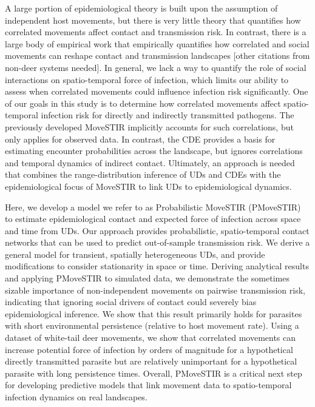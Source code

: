 \documentclass[letterpaper]{article}
\begin{document}
A large portion of epidemiological theory is built upon the assumption of independent host movements, but there is very little theory that quantifies how correlated movements affect contact and transmission risk. In contrast, there is a large body of empirical work that empirically quantifies how correlated and social movements can reshape contact and transmission landscapes \citep{Kjaer2008,Grear2010,Schauber2015a,Webber2023} [other citations from non-deer systems needed]. In general, we lack a way to quantify the role of social interactions on spatio-temporal force of infection, which limits our ability to assess when correlated movements could influence infection risk significantly. One of our goals in this study is to determine how correlated movements affect spatio-temporal infection risk for directly and indirectly transmitted pathogens. %
The previously developed MoveSTIR implicitly accounts for such correlations, but only applies for observed data. In contrast, the CDE provides a basis for estimating encounter probabilities across the landscape, but ignores correlations and temporal dynamics of indirect contact.
Ultimately, an approach is needed that combines the range-distribution inference of UDs and CDEs \citep{Alston2022,Noonan2021} with the epidemiological focus of MoveSTIR to link UDs to epidemiological dynamics. 

Here, we develop a model we refer to as Probabilistic MoveSTIR (PMoveSTIR) to estimate epidemiological contact and expected force of infection across space and time from UDs. Our approach provides probabilistic, spatio-temporal contact networks that can be used to predict out-of-sample transmission risk. We derive a general model for transient, spatially heterogeneous UDs, and provide modifications to consider stationarity in space or time. %
Deriving analytical results and applying PMoveSTIR to simulated data, we demonstrate the sometimes sizable importance of non-independent movements on pairwise transmission risk, indicating that ignoring social drivers of contact could severely bias epidemiological inference. We show that this result primarily holds for parasites with short environmental persistence (relative to host movement rate). %
Using a dataset of white-tail deer movements, we show that correlated movements can increase potential force of infection by orders of magnitude for a hypothetical directly transmitted parasite but are relatively unimportant for a hypothetical parasite with long persistence times. 
Overall, PMoveSTIR is a critical next step for developing predictive models that link movement data to spatio-temporal infection dynamics on real landscapes.
\end{document}
